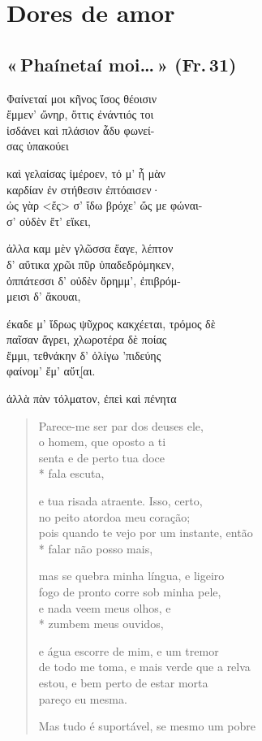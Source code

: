 \chapter{Dores de amor}

\section[«\,Phaínetaí moi\ldots{}\,» (Fr.\,31)]{«\,Phaínetaí moi\ldots{}\,» (Fr.\,31)}

\begin{gkverse}
Φαίνεταί μοι κῆνος ἴσος θέοισιν\\
ἔμμεν’ ὤνηρ, ὄττις ἐνάντιός τοι\\
ἰσδάνει καὶ πλάσιον ἆδυ φωνεί-\\
σας ὐπακούει

καὶ γελαίσας ἰμέροεν, τό μ’ ἦ μὰν\\
καρδίαν ἐν στήθεσιν ἐπτόαισεν·\\
ὠς γὰρ <ἔς> σ’ ἴδω βρόχε’ ὤς με φώναι-\\
σ’ οὐδὲν ἔτ’ εἴκει,

ἀλλα \dagger{}καμ\dagger{} μὲν γλῶσσα \dagger{}ἔαγε\dagger{}, λέπτον\\
δ’ αὔτικα χρῶι πῦρ ὐπαδεδρόμηκεν,\\
ὀππάτεσσι δ’ οὐδὲν ὄρημμ’, ἐπιβρόμ-\\
μεισι δ’ ἄκουαι,

\dagger{}έκαδε\dagger{} μ’ ἴδρως ψῦχρος κακχέεται, τρόμος δὲ\\
παῖσαν ἄγρει, χλωροτέρα δὲ ποίας\\
ἔμμι, τεθνάκην δ’ ὀλίγω ’πιδεύης\\
φαίνομ’ ἔμ’ αὔτ[̣αι.

ἀλλὰ πὰν τόλματον, ἐπεὶ \dagger{}καὶ πένητα\dagger{}
\end{gkverse}

\pagebreak
\begin{verse}
Parece-me ser par dos deuses ele,\\
o homem, que oposto a ti\\
senta e de perto tua doce\\*
fala escuta,

e tua risada atraente. Isso, certo,\\
no peito atordoa meu coração;\\
pois quando te vejo por um instante, então\\*
falar não posso mais,

mas se quebra minha língua, e ligeiro\\
fogo de pronto corre sob minha pele,\\
e nada veem meus olhos, e\\*
zumbem meus ouvidos,

e água escorre de mim, e um tremor\\
de todo me toma, e mais verde que a relva\\
estou, e bem perto de estar morta\\
pareço eu mesma.

Mas tudo é suportável, se mesmo um pobre 
\end{verse}

